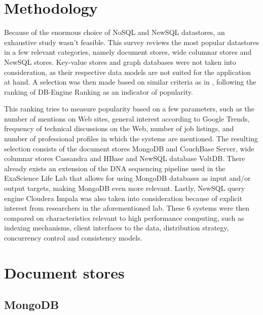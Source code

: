 \documentclass{IEEEtran}
\begin{document}
\section{Methodology}

Because of the enormous choice of NoSQL and NewSQL datastores, an exhaustive study wasn't feasible. This survey reviews the most popular datastores in a few relevant cate\-gories, namely document stores, wide columnar stores and NewSQL stores. Key-value stores and graph databases were not taken into consideration, as their respective data models are not suited for the application at hand. A selection was then made based on similar criteria as in \cite{grolinger2013data}, following the ranking of DB-Engine Ranking \cite{db_engine_rank} as an indicator of popularity. 
\begin{landscape}

\end{landscape}
This ranking tries to measure popularity based on a few parameters, such as the number of mentions on Web sites, general interest according to Google Trends, frequency of technical discussions on the Web, number of job listings, and number of professional profiles in which the systems are mentioned. The resulting selection consists of the document stores MongoDB and CouchBase Server, wide columnar stores Cassandra and HBase and NewSQL database VoltDB. There already exists an extension of the DNA sequencing pipeline used in the ExaScience Life Lab that allows for using MongoDB databases as input and/or output targets, making MongoDB even more relevant\cite{elprep_mongo}. Lastly, NewSQL query engine Cloudera Impala was also taken into consideration because of explicit interest from researchers in the aforementioned lab.
These 6 systems were then compared on characteristics relevant to high performance computing, such as indexing mechanisms, client interfaces to the data, distribution strategy, concurrency control and consistency models.

\section{Document stores}

\subsection{MongoDB}
\end{document}
